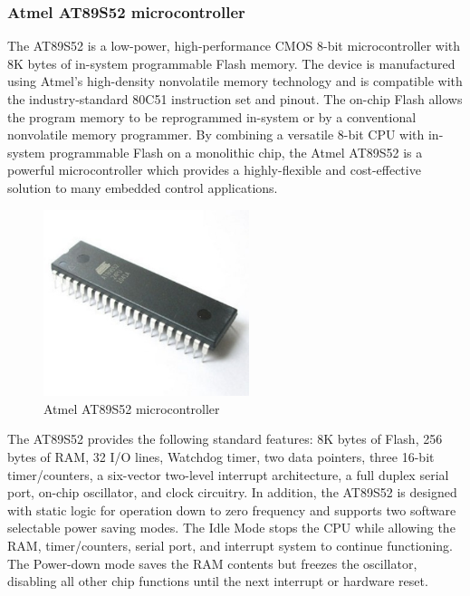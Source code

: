 \documentclass[a4paper]{article}
\begin{document}
\subsubsection{Atmel AT89S52 microcontroller}
The AT89S52 is a low-power, high-performance CMOS 8-bit microcontroller with 8K
bytes of in-system programmable Flash memory. The device is manufactured using
Atmel’s high-density nonvolatile memory technology and is compatible with the industry-standard 80C51 instruction set and pinout. The on-chip Flash allows the program
memory to be reprogrammed in-system or by a conventional nonvolatile memory programmer. By combining a versatile 8-bit CPU with in-system programmable Flash on
a monolithic chip, the Atmel AT89S52 is a powerful microcontroller which provides a
highly-flexible and cost-effective solution to many embedded control applications.
\begin{figure}[h!]
\centering
\includegraphics[width=6cm]{images/atmel_at89s52_microcontroller.jpg}
\caption*{Atmel AT89S52 microcontroller}
\end{figure}
\newline
\noindent
The AT89S52 provides the following standard features: 8K bytes of Flash, 256 bytes
of RAM, 32 I/O lines, Watchdog timer, two data pointers, three 16-bit timer/counters, a
six-vector two-level interrupt architecture, a full duplex serial port, on-chip oscillator,
and clock circuitry. In addition, the AT89S52 is designed with static logic for operation
down to zero frequency and supports two software selectable power saving modes.
The Idle Mode stops the CPU while allowing the RAM, timer/counters, serial port, and
interrupt system to continue functioning. The Power-down mode saves the RAM contents but freezes the oscillator, disabling all other chip functions until the next interrupt or hardware reset.
\end{document}
